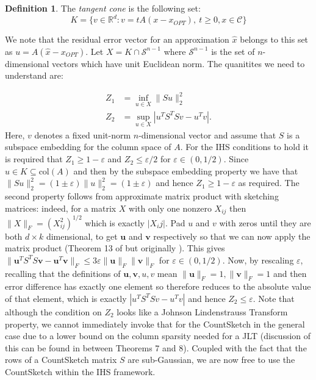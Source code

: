 \documentclass[twoside]{article}
\newcommand{\R}{\mathbb{R}}
\newcommand{\eps}{\varepsilon}
\newcommand{\mat}[1]{\boldsymbol{#1}}
\theoremstyle{definition}\newtheorem{thm}{Theorem}[section]
\theoremstyle{definition}\newtheorem{mydef}[thm]{Definition}
\theoremstyle{definition}\newtheorem{rem}[thm]{Remark}
\theoremstyle{definition}\newtheorem{prop}[thm]{Proposition}
\theoremstyle{definition}\newtheorem{example}[thm]{Example}
\theoremstyle{definition}\newtheorem{claim}[thm]{Claim}
\theoremstyle{definition}\newtheorem{Qu}[thm]{Question}
\theoremstyle{definition}\newtheorem{Lemma}[thm]{Lemma}
\theoremstyle{definition}\newtheorem{Cor}[thm]{Corollary}
\theoremstyle{definition}\newtheorem{Fact}[]{Fact}
\begin{document}
\begin{mydef}
  The \textit{tangent cone} is the following set:
  \begin{equation}
    K = \{ v \in \R^d : v = tA(x-x_{OPT}), ~ t \ge 0, x \in \mathcal{C}\}
  \end{equation}
\end{mydef}
\noindent We note that the residual error vector for an approximation $\hat{x}$
belongs to this set as $u=A(\hat{x} - x_{OPT})$.
Let $X = K \cap \mathcal{S}^{n-1}$ where $\mathcal{S}^{n-1}$ is the set of $n$-
dimensional vectors which have unit Euclidean norm.
The quanitites we need to understand are:

\begin{align}
  Z_1 &= \inf_{u \in X} \|Su\|_2^2 \\
  Z_2 &= \sup_{u \in X} | u^T S^T S v - u^T v |.
\end{align}
\noindent Here, $v$ denotes a fixed unit-norm $n$-dimensional vector and assume
that $S$ is a subspace embedding for the column space of $A$.
For the IHS conditions to hold it is required that $Z_1 \ge 1-\eps$ and
$Z_2 \le \eps/2$ for $\eps \in (0,1/2)$.
Since $ u \in K \subseteq \text{col}(A)$ and then by the subspace embedding
property we have that $\|Su\|_2^2 = (1 \pm \eps)\|u\|_2^2 = (1 \pm \eps)$ and
hence $Z_1  \ge 1-\eps$ as required.
The second property follows from approximate matrix product with sketching
matrices:
indeed, for a matrix $X$ with only one nonzero $X_{ij}$ then $\|X\|_F = (X_{ij}^2)^{1/2}$
which is exactly $|X_ij|$.
Pad $u$ and $v$ with zeros until they are both $d \times k$ dimensional, to get
$\mat{u}$ and $\mat{v}$ respectively so that we can now apply the matrix product
(Theorem 13 of \cite{woodruff2014sketching} but originally \cite{kane2014sparser}).
This gives $\|\mat{u}^T S^TS \mat{v} - \mat{u}^T\mat{v}\|_F \le 3 \eps \|\mat{u}\|_F \|\mat{v}\|_F$
for $\eps \in (0,1/2)$.
Now, by rescaling $\eps$, recalling that the definitions of $\mat{u},\mat{v},u,v$
mean $\|\mat{u}\|_F = 1, \|\mat{v}\|_F=1$ and then error difference has exactly
one element so therefore reduces to the absolute value of that element, which is
exactly $| u^T S^T S v - u^T v |$ and hence $Z_2 \le \eps$.
Note that although the condition on $Z_2$ looks like a Johnson Lindenstrauss
Transform property, we cannot immediately invoke that for the CountSketch in the
general case due to a lower bound on the column sparsity needed for  a JLT
(discussion of this can be found in \cite{woodruff2014sketching} between Theorems
7 and 8).
Coupled with the fact that the rows of a CountSketch matrix $S$ are sub-Gaussian,
we are now free to use the CountSketch within the IHS framework.
\end{document}
